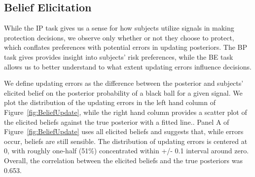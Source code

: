 
\subsection{Belief Elicitation}
While the IP task gives us a sense for how subjects utilize signals in making protection decisions, we observe only whether or not they choose to protect, which conflates preferences with potential errors in updating posteriors.  The BP task gives provides insight into subjects' risk preferences, while the BE task allows us to better understand to what extent updating errors influence decisions.  

We define updating errors as the difference between the posterior and subjects' elicited belief on the posterior probability of a black ball for a given signal.  We plot the distribution of the updating errors in the left hand column of Figure~\ref{fig:BeliefUpdate}, while the right hand column provides a scatter plot of the elicited beliefs against the true posterior with a fitted line..
Panel A of Figure~\ref{fig:BeliefUpdate} uses all elicited beliefs and suggests that, while errors occur, beliefs are still sensible. The distribution of updating errors is centered at 0, with roughly one-half (51\%) concentrated within +/- 0.1 interval around zero. Overall, the correlation between the elicited beliefs and the true posteriors was 0.653.  

